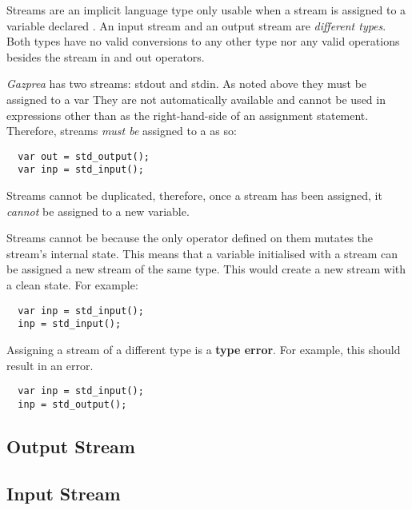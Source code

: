 \documentclass[../../gazprea.tex]{subfiles}
\begin{document}
Streams are an implicit language type only usable when a stream is assigned to a variable declared
. An input stream and an output stream are \textit{different types}. Both types have no
valid conversions to any other type nor any valid operations besides the stream in and out
operators.

\textit{Gazprea} has two streams: stdout and stdin. As noted above they must be assigned to a var
They are not automatically available and cannot be used in expressions other than as the
right-hand-side of an assignment statement. Therefore, streams \textit{must be} assigned to a
 as so:
\begin{lstlisting}
  var out = std_output();
  var inp = std_input();
\end{lstlisting}

Streams cannot be duplicated, therefore, once a stream has been assigned, it \textit{cannot} be
assigned to a new variable.

Streams cannot be  because the only operator defined on them mutates the stream's
internal state. This means that a variable initialised with a stream can be assigned a new stream of
the same type. This would create a new stream with a clean state. For example:
\begin{lstlisting}
  var inp = std_input();
  inp = std_input();
\end{lstlisting}

Assigning a stream of a different type is a \textbf{type error}. For example, this should result in
an error.
\begin{lstlisting}
  var inp = std_input();
  inp = std_output();
\end{lstlisting}

\subsection{Output Stream}
\label{ssec:output}


\subsection{Input Stream}
\label{ssec:input}

\end{document}
